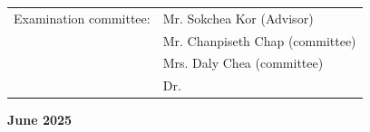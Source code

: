 \begin{titlepage}
    \vspace{2.5cm}

    {\englishfont
    \begin{center}
        \begin{tabular}{ll}
            {Examination committee:} & Mr. Sokchea Kor (Advisor) \\
                                    & Mr. Chanpiseth Chap (committee) \\
                                    & Mrs. Daly Chea (committee)\\
                                    & Dr. \dotfill
        \end{tabular}
    \end{center}
    }

    \vfill
    {\Large\bfseries June 2025\par}
\end{titlepage}
